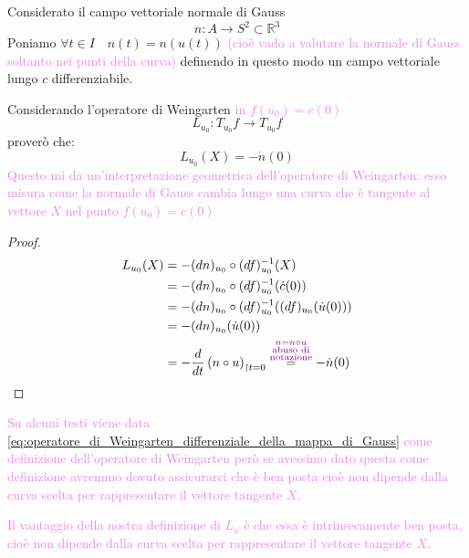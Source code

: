         \begin{osservazione}
        \mbox{}

        Considerato il campo vettoriale normale di Gauss
        \[ n \colon A \to S^2 \subset \mathbb{R}^3 \]
        Poniamo $\forall t \in I \quad n(t) = n(u(t))$ 
        \textcolor{violet}{(cioè vado a valutare la normale di Gauss soltanto nei punti della curva)}
        definendo in questo modo un
        campo vettoriale lungo $c$ differenziabile.

        Considerando l'operatore di Weingarten \textcolor{violet}{in $f(u_0)= c(0)$}
        \[ L_{u_0} \colon T_{u_0}f \to T_{u_0}f \]
        proverò che:
        \begin{equation}
        \label{eq:operatore_di_Weingarten_differenziale_della_mappa_di_Gauss}
            L_{u_0}(X) = - \dot{n}(0)
        \end{equation}
        \textcolor{violet}{Questo mi da un'interpretazione geometrica dell'operatore di Weingarten: esso misura come la normale di Gauss cambia lungo una
        curva che è tangente al vettore $X$ nel punto $f(u_0)=c(0)$}
        \begin{proof}
        \[ \begin{aligned}
            L_{u_0}(X) &= -(dn)_{u_0} \circ (df)^{-1}_{u_0}(X) \\
                      &= -(dn)_{u_0} \circ (df)^{-1}_{u_0}( \dot{c}(0)) \\
                      &= -(dn)_{u_0} \circ (df)^{-1}_{u_0}( (df)_{u_0} (\dot{u}(0)) ) \\
                      &= -(dn)_{u_0} (\dot{u}(0)) \\
                      &= -\frac{d}{dt} \left(n \circ u\right)_{\restriction t=0} \overset{\textcolor{violet}{\substack{n=n \circ u \\ \text{abuso di}  \\ \text{notazione}}}}{=} -\dot{n}(0)
        \end{aligned} \]
        \end{proof}
        \textcolor{violet}{Su alcuni testi viene data \eqref{eq:operatore_di_Weingarten_differenziale_della_mappa_di_Gauss}
        come definizione dell'operatore di Weingarten però se avessimo dato questa come definizione avremmo dovuto assicurarci
        che è ben posta cioè non dipende dalla curva scelta per rappresentare il vettore tangente $X$.}

        \textcolor{violet}{Il vantaggio della nostra definizione di $L_u$ è che essa è intrinsecamente ben posta, cioè non dipende dalla curva scelta per rappresentare il vettore tangente $X$.}
        \end{osservazione}
